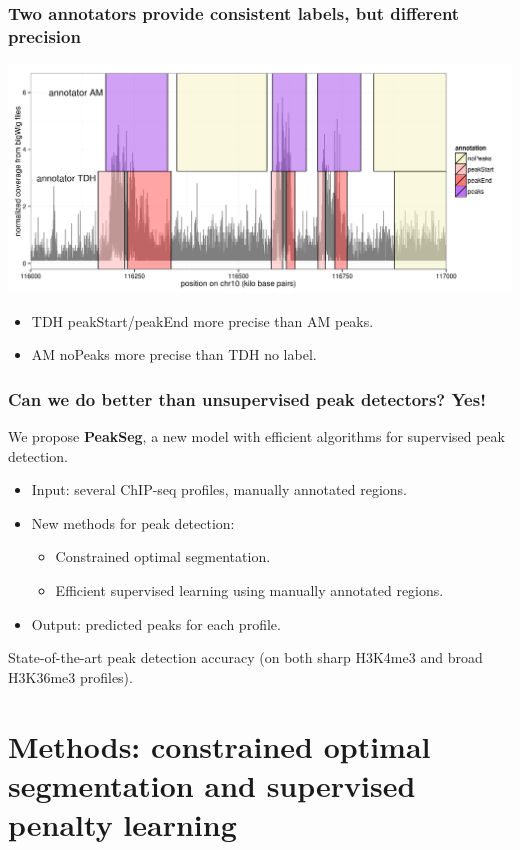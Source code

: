 \documentclass{beamer}
\begin{document}
\begin{frame}
  \frametitle{Two annotators provide consistent labels, but different
    precision}
  \includegraphics[width=1.1\textwidth]{figure-several-annotators}

  \begin{itemize}
  \item TDH peakStart/peakEnd more precise than AM peaks.
  \item AM noPeaks more precise than TDH no label.
  \end{itemize}
\end{frame}

\begin{frame}
  \frametitle{Can we do better than unsupervised peak detectors? Yes!}
  We propose \textbf{PeakSeg}, a new model with efficient algorithms
  for supervised peak detection.
  \begin{itemize}
  \item Input: \alert<1>{several ChIP-seq profiles},
    \alert<2>{manually annotated regions}.
  \item New methods for peak detection: 
    \begin{itemize}
    \item \alert<1>{Constrained optimal segmentation}.
    \item Efficient \alert<2>{supervised learning using manually annotated
      regions}.
    \end{itemize}
  \item Output: predicted peaks for each profile.
  \end{itemize}
  State-of-the-art peak detection accuracy (on both sharp H3K4me3 and
  broad H3K36me3 profiles).
\end{frame}

\section{Methods: constrained optimal segmentation and 
  supervised penalty learning}
\end{document}
